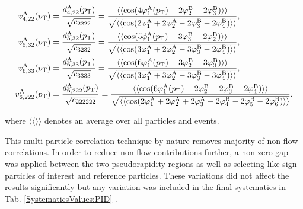 \documentclass[ALICE,manyauthors]{cernphprep}
\begin{document}
\begin{align}
v_{4,22}^{\rm{A}}(p_{\rm{T}}) &= \frac{d_{4,22}^{\rm{A}}(p_{\rm{T}})}{\sqrt{c_{2222}}} =  \frac{\langle\langle \cos(4\varphi^{\rm{A}}_{1}(p_{\rm{T}})-2\varphi^{\rm{B}}_{2}-2\varphi^{\rm{B}}_{3})\rangle\rangle}{\sqrt{\langle\langle \cos(2\varphi^{\rm{A}}_{1}+2\varphi^{\rm{A}}_{2}-2\varphi^{\rm{B}}_{3}-2\varphi^{\rm{B}}_{4}) \rangle\rangle}}, \label{Eq:VA422} \\
v_{5,32}^{\rm{A}}(p_{\rm{T}}) &= \frac{d_{5,32}^{\rm{A}}(p_{\rm{T}})}{\sqrt{c_{3232}}} = \frac{\langle\langle \cos(5\phi^{\rm{A}}_{1}(p_{\rm{T}})-3\varphi^{\rm{B}}_{3}-2\varphi^{\rm{B}}_{2})\rangle\rangle}{\sqrt{\langle\langle \cos(3\varphi^{\rm{A}}_{1}+2\varphi^{\rm{A}}_{2}-3\varphi^{\rm{B}}_{3}-2\varphi^{\rm{B}}_{4}) \rangle\rangle}}, \label{Eq:VA532}\\
v_{6,33}^{\rm{A}}(p_{\rm{T}}) &= \frac{d_{6,33}^{\rm{A}}(p_{\rm{T}})}{\sqrt{c_{3333}}} =\frac{\langle\langle \cos(6\varphi^{A}_{1}(p_{\rm{T}})-3\varphi^{\rm{B}}_{2}-3\varphi^{\rm{B}}_{3})\rangle\rangle}{\sqrt{\langle\langle \cos(3\varphi^{\rm{A}}_{1}+3\varphi^{\rm{A}}_{2}-3\varphi^{\rm{B}}_{3}-3\varphi^{\rm{B}}_{4}) \rangle\rangle}}, \label{Eq:VA633}\\
v_{6,222}^{\rm{A}}(p_{\rm{T}}) &= \frac{d_{6,222}^{\rm{A}}(p_{\rm{T}})}{\sqrt{c_{222222}}} =\frac{\langle\langle \cos(6\varphi^{\rm{A}}_{1}(p_{\rm{T}})-2\varphi^{\rm{B}}_{2}-2\varphi^{\rm{B}}_{3}-2\varphi^{\rm{B}}_{4})\rangle\rangle}{\sqrt{\langle\langle \cos(2\varphi^{\rm{A}}_{1}+2\varphi^{\rm{A}}_{2}+2\varphi^{\rm{A}}_{3}-2\varphi^{\rm{B}}_{4}-2\varphi^{\rm{B}}_{5}-2\varphi^{\rm{B}}_{6}) \rangle\rangle}},
\label{Eq:VA6222}
\end{align}

where $\langle\langle\rangle\rangle$ denotes an average over all particles and events.


This multi-particle correlation technique by nature removes majority of non-flow correlations. In order to reduce non-flow contributions further, a non-zero gap was applied between the two pseudorapidity regions as well as selecting like-sign particles of interest and reference particles. These variations did not affect the results significantly but any variation was included in the final systematics in Tab. \ref{SystematicsValues:PID} .
\end{document}
